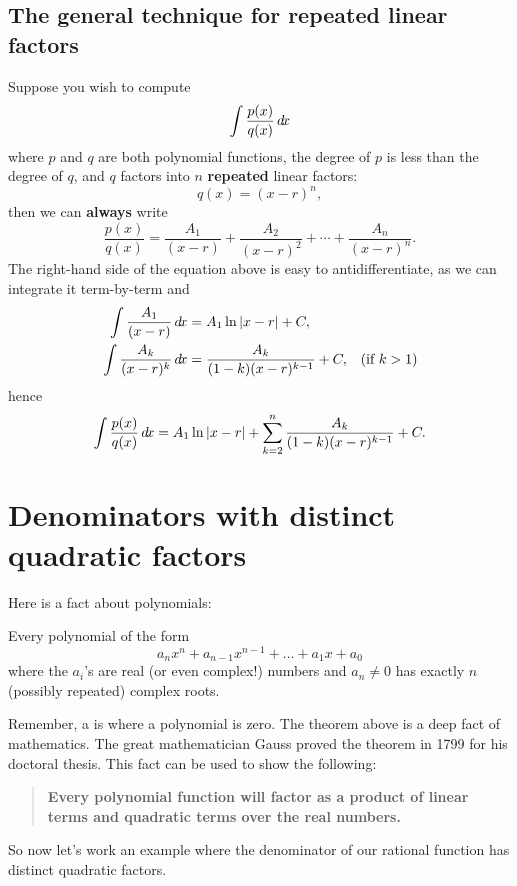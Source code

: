 \documentclass{ximera}
\begin{document}
\subsection{The general technique for repeated linear factors}

Suppose you wish to compute
\[
\int \frac{p(x)}{q(x)} \mathop{}\!d\! x
\]
where $p$ and $q$ are both polynomial functions, the degree of $p$ is
less than the degree of $q$, and $q$ factors into $n$
\textbf{repeated} linear factors:
\[
q(x) = (x-r)^n,
\]
then we can \textbf{always} write
\[
\frac{p(x)}{q(x)}  = \frac{A_1}{(x-r)} + \frac{A_2}{(x-r)^2} + \cdots + \frac{A_n}{(x-r)^n}. 
\]
The right-hand side of the equation above is easy to
antidifferentiate, as we can integrate it term-by-term and
\begin{align*}
  \int \frac{A_1}{(x-r)} \mathop{}\!d\! x &= A_1 \ln|x-r| + C,\\
  \int \frac{A_k}{(x-r)^k} \mathop{}\!d\! x &= \frac{A_k}{(1-k)(x-r)^{k-1}}+ C, &\text{(if $k>1$)}
\end{align*}
hence
\[
\int \frac{p(x)}{q(x)} \mathop{}\!d\! x = A_1 \ln|x-r|  + \sum_{k=2}^n \frac{A_k}{(1-k)(x-r)^{k-1}} + C.
\]






\section{Denominators with distinct quadratic factors}

Here is a fact about polynomials:

\begin{theorem}
  Every polynomial of the form
  \[
  a_n x^n + a_{n-1} x^{n-1} + \dots + a_1 x + a_0
  \]
  where the $a_i$'s are real (or even complex!) numbers and $a_n \ne 0$ has exactly
  $n$ (possibly repeated) complex roots.
\end{theorem}

Remember, a  is where a polynomial is zero. The theorem
above is a deep fact of mathematics. The great mathematician Gauss
proved the theorem in 1799 for his doctoral thesis. This fact can be
used to show the following:
\begin{quote}
  \textbf{Every polynomial function will factor as a product of linear
    terms and quadratic terms over the real numbers.}
\end{quote}

So now let's work an example where the denominator of our rational
function has distinct quadratic factors.
\end{document}
